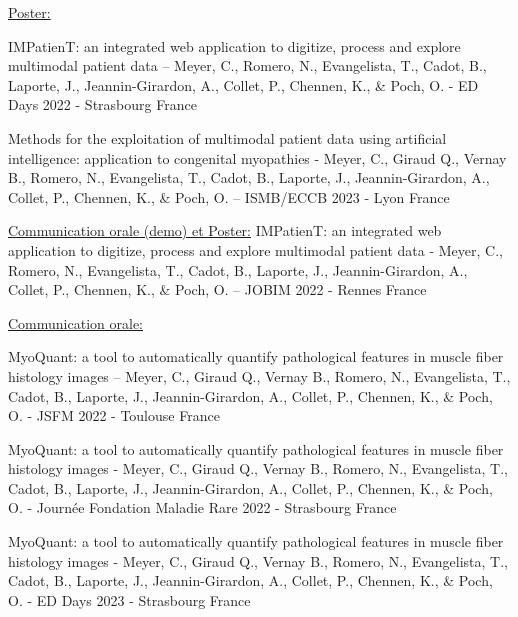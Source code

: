 \underline{Poster:} 

IMPatienT: an integrated web application to digitize, process and explore multimodal patient data – Meyer, C., Romero, N., Evangelista, T., Cadot, B., Laporte, J., Jeannin-Girardon, A., Collet, P., Chennen, K., \& Poch, O. - ED Days 2022 - Strasbourg France

Methods for the exploitation of multimodal patient data using artificial intelligence: application to congenital myopathies - Meyer, C., Giraud Q., Vernay B., Romero, N., Evangelista, T., Cadot, B., Laporte, J., Jeannin-Girardon, A., Collet, P., Chennen, K., \& Poch, O. – ISMB/ECCB 2023 - Lyon France

\underline{Communication orale (demo) et Poster:} IMPatienT: an integrated web application to digitize, process and explore multimodal patient data - Meyer, C., Romero, N., Evangelista, T., Cadot, B., Laporte, J., Jeannin-Girardon, A., Collet, P., Chennen, K., \& Poch, O.  – JOBIM 2022 - Rennes France

\underline{Communication orale:}

MyoQuant: a tool to automatically quantify pathological features in muscle fiber histology images – Meyer, C., Giraud Q., Vernay B., Romero, N., Evangelista, T., Cadot, B., Laporte, J., Jeannin-Girardon, A., Collet, P., Chennen, K., \& Poch, O.  - JSFM 2022 - Toulouse France

MyoQuant: a tool to automatically quantify pathological features in muscle fiber histology images - Meyer, C., Giraud Q., Vernay B., Romero, N., Evangelista, T., Cadot, B., Laporte, J., Jeannin-Girardon, A., Collet, P., Chennen, K., \& Poch, O. - Journée Fondation Maladie Rare 2022 - Strasbourg France

MyoQuant: a tool to automatically quantify pathological features in muscle fiber histology images - Meyer, C., Giraud Q., Vernay B., Romero, N., Evangelista, T., Cadot, B., Laporte, J., Jeannin-Girardon, A., Collet, P., Chennen, K., \& Poch, O. - ED Days 2023 - Strasbourg France
